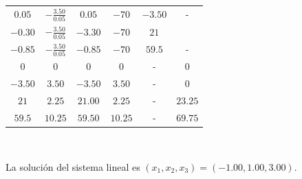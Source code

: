 \documentclass[
	spanish,
	8pt,
	utf8,
	xcolor=table,
	handout,
	aspectratio=169,
	professionalfonts,
	mathserif,
	leqno,
]{beamer}
\begin{document}
\begin{frame}
\begin{minipage}{0.6\textwidth}
\begin{table}[ht!]
\begin{tabular}{|cccccc|}
				$0.05$                                                                                                & $-\tfrac{3.50}{0.05}$             & $0.05$  & $-70$   & $-3.50$ & -       \\
				$-0.30$                                                                                               & $-\tfrac{3.50}{0.05}$             & $-3.30$ & $-70$   & $21$    &         \\
				$-0.85$                                                                                               & $-\tfrac{3.50}{0.05}$             & $-0.85$ & $-70$   & $59.5$  & -       \\
				$0$                                                                                                   & $0$                               & $0$     & $0$     & -       & $0$     \\
				$-3.50$                                                                                               & $3.50$                            & $-3.50$ & $3.50$  & -       & $0$     \\
				$21$                                                                                                  & $2.25$                            & $21.00$ & $2.25$  & -       & $23.25$ \\
				$59.5$                                                                                                & $10.25$                           & $59.50$ & $10.25$ & -       & $69.75$ \\
				\hline
			\end{tabular}
		\end{table}

		\

		La solución del sistema lineal es
		\begin{math}
			\left(
			x_{1},
			x_{2},
			x_{3}
			\right)=
			\left(
			-1.00,
			1.00,
			3.00
			\right)
		\end{math}.
	\end{minipage}
\end{frame}

{
\begin{frame}[plain]
\end{frame}
}
\end{document}
